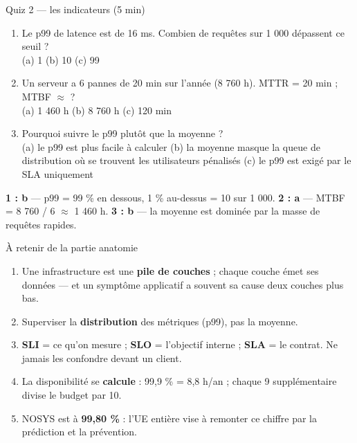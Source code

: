 \begin{frame}{Quiz 2 --- les indicateurs (5 min)}
\begin{qbox}[3 questions]
\begin{enumerate}
\item Le p99 de latence est de 16 ms. Combien de requêtes sur 1 000 dépassent ce seuil ?\\
(a) 1 \quad (b) 10 \quad (c) 99
\item Un serveur a 6 pannes de 20 min sur l'année (8 760 h). MTTR = 20 min ;
MTBF $\approx$ ?\\
(a) 1 460 h \quad (b) 8 760 h \quad (c) 120 min
\item Pourquoi suivre le p99 plutôt que la moyenne ?\\
(a) le p99 est plus facile à calculer \quad (b) la moyenne masque la queue
de distribution où se trouvent les utilisateurs pénalisés \quad
(c) le p99 est exigé par le SLA uniquement
\end{enumerate}
\end{qbox}
\vspace{1mm}
\begin{solbox}[Réponses]
\textbf{1 : b} --- p99 = 99 \% en dessous, 1 \% au-dessus = 10 sur 1 000.
\quad
\textbf{2 : a} --- MTBF = 8 760 / 6 $\approx$ 1 460 h.
\quad
\textbf{3 : b} --- la moyenne est dominée par la masse de requêtes rapides.
\end{solbox}
\end{frame}

\begin{frame}{À retenir de la partie anatomie}
\begin{kbox}
\begin{enumerate}
\item Une infrastructure est une \textbf{pile de couches} ; chaque couche émet
ses données --- et un symptôme applicatif a souvent sa cause deux couches plus bas.
\item Superviser la \textbf{distribution} des métriques (p99), pas la moyenne.
\item \textbf{SLI} = ce qu'on mesure ; \textbf{SLO} = l'objectif interne ;
\textbf{SLA} = le contrat. Ne jamais les confondre devant un client.
\item La disponibilité se \textbf{calcule} : 99,9 \% = 8,8 h/an ;
chaque 9 supplémentaire divise le budget par 10.
\item NOSYS est à \textbf{99,80 \%} : l'UE entière vise à remonter ce chiffre
par la prédiction et la prévention.
\end{enumerate}
\end{kbox}
\end{frame}
